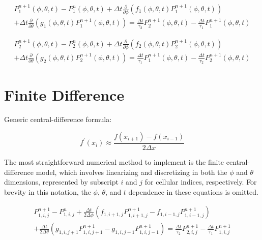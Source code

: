 \documentclass[12pt,a4paper,pagesize=pdftex]{scrartcl}
\begin{document}
\begin{multline*}
    P_1^{n+1}\left(\phi, \theta, t\right) - P_1^n\left(\phi, \theta, t\right) + \Delta t \frac{\partial}{\partial \phi} \left(f_1 \left(\phi, \theta, t\right) P_1^{n+1} \left(\phi, \theta, t\right)\right) \\+ \Delta t\frac{\partial}{\partial \theta} \left(g_1 \left(\phi, \theta, t\right) P_1^{n+1} \left(\phi, \theta, t\right)\right) = \frac{\Delta t}{\tau_2} P_2^{n+1}\left(\phi, \theta, t\right) - \frac{\Delta t}{\tau_1} P_1^{n+1} \left(\phi, \theta, t\right)
\end{multline*}

\begin{multline*}
    P_2^{n+1}\left(\phi, \theta, t\right) - P_2^n\left(\phi, \theta, t\right) + \Delta t \frac{\partial}{\partial \phi} \left(f_2 \left(\phi, \theta, t\right) P_2^{n+1} \left(\phi, \theta, t\right)\right) \\+ \Delta t\frac{\partial}{\partial \theta} \left(g_2 \left(\phi, \theta, t\right) P_2^{n+1} \left(\phi, \theta, t\right)\right) = \frac{\Delta t}{\tau_1} P_1^{n+1}\left(\phi, \theta, t\right) - \frac{\Delta t}{\tau_2} P_2^{n+1} \left(\phi, \theta, t\right)
\end{multline*}

\newpage
\section*{Finite Difference}

Generic central-difference formula:

\begin{equation*}
    f^\prime \left(x_i\right) \approx \frac{f\left(x_{i+1}\right) - f\left(x_{i-1}\right)}{2 \Delta x}
\end{equation*}

The most straightforward numerical method to implement is the finite central-difference model, which involves linearizing and discretizing in both the \(\phi\) and \(\theta\) dimensions, represented by subscript \(i\) and \(j\) for cellular indices, respectively. For brevity in this notation, the \(\phi\), \(\theta\), and \(t\) dependence in these equations is omitted.

\begin{multline*}
    P_{1,i,j}^{n+1} - P_{1,i,j}^n + \frac{\Delta t}{2 \Delta \phi} \left(f_{1,i+1,j}P^{n+1}_{1,i+1,j} - f_{1,i-1,j}P^{n+1}_{1,i-1,j}\right) \\+ \frac{\Delta t}{2 \Delta \theta} \left(g_{1,i,j+1} P^{n+1}_{1,i,j+1} - g_{1,i,j-1} P^{n+1}_{1,i,j-1}\right) = \frac{\Delta t}{\tau_2} P^{n+1}_{2,i,j} - \frac{\Delta t}{\tau_1}P^{n+1}_{1,i,j}
\end{multline*}
\end{document}
